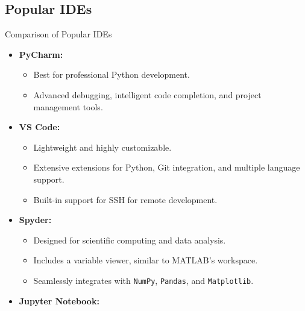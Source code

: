 \documentclass[10pt]{beamer}
\let\olditem\item
\renewcommand\item{\olditem\justifying}
\begin{document}
	\subsection{Popular IDEs}
	\begin{frame}{Comparison of Popular IDEs}
		\begin{adjustbox}{scale=.9}
		\begin{minipage}{1.11\linewidth}
		\begin{itemize}	
			\item \textbf{PyCharm:}
			\hfill{}
			\begin{itemize}
				\item Best for professional Python development.
				\item Advanced debugging, intelligent code completion, and project management tools.
			\end{itemize}
			\item \textbf{VS Code:}
			\hfill{}
			\begin{itemize}
				\item Lightweight and highly customizable.
				\item Extensive extensions for Python, Git integration, and multiple language support.
				\item Built-in support for SSH for remote development.
			\end{itemize}
			\item \textbf{Spyder:}
			\hfill{}
			\begin{itemize}
				\item Designed for scientific computing and data analysis.
				\item Includes a variable viewer, similar to MATLAB's workspace.
				\item Seamlessly integrates with \texttt{NumPy}, \texttt{Pandas}, and \texttt{Matplotlib}.
			\end{itemize}
			\item \textbf{Jupyter Notebook:}
			\hfill{}

\end{itemize}
\end{minipage}
\end{adjustbox}
\end{frame}
\end{document}
